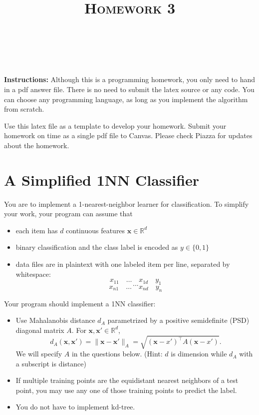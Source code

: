 \documentclass[a4paper]{article}
\title{\textsc{Homework 3}} %
\author{
\red{$AKASH SHARMA$} \\
\red{$9081731771$}\\
}
\date{}
\theoremstyle{definition}
\newcommand{\RR}{\mathbb{R}}
\def\x{\mathbf x}
\begin{document}
\maketitle 


\textbf{Instructions:} 
Although this is a programming homework, you only need to hand in a pdf answer file.
There is no need to submit the latex source or any code.
You can choose any programming language, as long as you implement the algorithm from scratch. 

Use this latex file as a template to develop your homework.
Submit your homework on time as a single pdf file to Canvas.
Please check Piazza for updates about the homework.

\section{A Simplified 1NN Classifier}
You are to implement a 1-nearest-neighbor learner for classification.
To simplify your work, your program can assume that
\begin{itemize}
\item each item has $d$ continuous features $\x \in \RR^d$
\item binary classification and the class label is encoded as $y \in \{0,1\}$
\item data files are in plaintext with one labeled item per line, separated by whitespace:
$$x_{11} \quad \ldots \quad x_{1d} \quad y_1$$
$$...$$
$$x_{n1} \quad \ldots \quad x_{nd} \quad y_n$$
\end{itemize}

Your program should implement a 1NN classifier: 
\begin{itemize}
\item Use Mahalanobis distance $d_A$ parametrized by a positive semidefinite (PSD) diagonal matrix $A$.  For $\x, \x' \in \RR^d$,
$$d_A(\x,\x') = \|\x-\x'\|_A = \sqrt{(\x-x')^\top A (\x-x')}.$$
We will specify $A$ in the questions below. (Hint: $d$ is dimension while $d_A$ with a subscript is distance)
\item If multiple training points are the equidistant nearest neighbors of a test point, you may use any one of those training points to predict the label.
\item You do not have to implement kd-tree.
\end{itemize}
\end{document}
